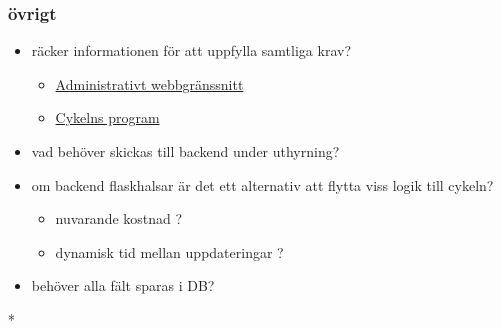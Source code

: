 \documentclass[11pt]{article}
\begin{document}
\subsubsection{övrigt}
\label{sec:org5033102}
\begin{itemize}
\item räcker informationen för att uppfylla samtliga krav?
\begin{itemize}
\item \href{https://docs.google.com/document/d/1zWksQNmkXJgM7Q66k3-mgcxrexO6eF9xqd0Z632BwlU/edit\#heading=h.h9x6l2mn1h7}{Administrativt webbgränssnitt}
\item \href{https://docs.google.com/document/d/1zWksQNmkXJgM7Q66k3-mgcxrexO6eF9xqd0Z632BwlU/edit\#heading=h.yro5c9zb5bii}{Cykelns program}
\end{itemize}
\item vad behöver skickas till backend under uthyrning?
\item om backend flaskhalsar är det ett alternativ att flytta viss logik till cykeln?
\begin{itemize}
\item nuvarande kostnad ?
\item dynamisk tid mellan uppdateringar ?
\end{itemize}
\item behöver alla fält sparas i DB?
\end{itemize}

*
\end{document}
